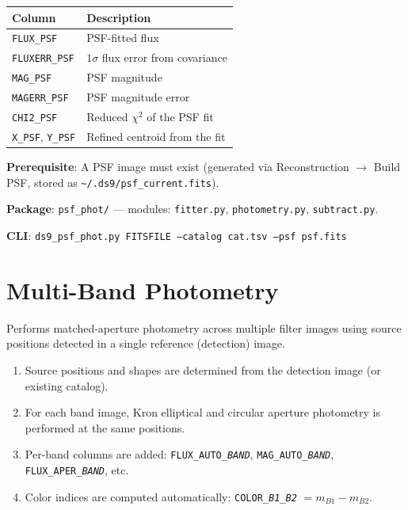 \documentclass[11pt,fleqn]{book}
\begin{document}
\begin{center}
\begin{tabular}{ll}
\toprule
\textbf{Column} & \textbf{Description} \\
\midrule
\texttt{FLUX\_PSF} & PSF-fitted flux \\
\texttt{FLUXERR\_PSF} & $1\sigma$ flux error from covariance \\
\texttt{MAG\_PSF} & PSF magnitude \\
\texttt{MAGERR\_PSF} & PSF magnitude error \\
\texttt{CHI2\_PSF} & Reduced $\chi^2$ of the PSF fit \\
\texttt{X\_PSF}, \texttt{Y\_PSF} & Refined centroid from the fit \\
\bottomrule
\end{tabular}
\end{center}

\textbf{Prerequisite}: A PSF image must exist (generated via Reconstruction $\to$ Build PSF, stored as \texttt{\textasciitilde/.ds9/psf\_current.fits}).

\textbf{Package}: \texttt{psf\_phot/} --- modules: \texttt{fitter.py}, \texttt{photometry.py}, \texttt{subtract.py}.

\textbf{CLI}: \texttt{ds9\_psf\_phot.py FITSFILE --catalog cat.tsv --psf psf.fits}


\section{Multi-Band Photometry}

Performs matched-aperture photometry across multiple filter images using source positions detected in a single reference (detection) image.

\begin{enumerate}[leftmargin=2em]
  \item Source positions and shapes are determined from the detection image (or existing catalog).
  \item For each band image, Kron elliptical and circular aperture photometry is performed at the same positions.
  \item Per-band columns are added: \texttt{FLUX\_AUTO\_\textit{BAND}}, \texttt{MAG\_AUTO\_\textit{BAND}}, \texttt{FLUX\_APER\_\textit{BAND}}, etc.
  \item Color indices are computed automatically: \texttt{COLOR\_\textit{B1}\_\textit{B2}} $= m_{B1} - m_{B2}$.
\end{enumerate}
\end{document}
